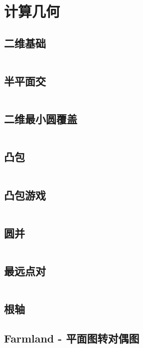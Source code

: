 \section{计算几何}
\subsection{二维基础}
\inputminted[breaklines]{cpp}{./computational_geometry/two_dimensions_basic.cpp}
\subsection{半平面交}
\inputminted[breaklines]{cpp}{./computational_geometry/half_plane_intersection.cpp}
\subsection{二维最小圆覆盖}
\inputminted[breaklines]{cpp}{./computational_geometry/2D-minimum-circle-coverage.cpp}
\subsection{凸包}
\inputminted[breaklines]{cpp}{./computational_geometry/convex_hull.cpp}
\subsection{凸包游戏}
\inputminted[breaklines]{cpp}{./computational_geometry/convex_hull_game.cpp}
\subsection{圆并}
\inputminted[breaklines]{cpp}{./computational_geometry/circle_union.cpp}
\subsection{最远点对}
\inputminted[breaklines]{cpp}{./computational_geometry/farthest_point_pair.cpp}
\subsection{根轴}

\subsection{Farmland - 平面图转对偶图}
\inputminted[breaklines]{cpp}{./computational_geometry/Farmland.cpp}